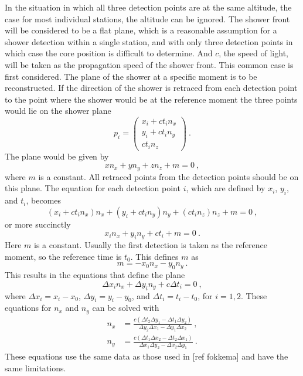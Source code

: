 In the situation in which all three detection points are at the same altitude, the case for most individual stations, the altitude can be ignored. The shower front will be considered to be a flat plane, which is a reasonable assumption for a shower detection within a single station, and with only three detection points in which case the core position is difficult to determine. And $c$, the speed of light, will be taken as the propagation speed of the shower front. This common case is first considered. The plane of the shower at a specific moment is to be reconstructed. If the direction of the shower is retraced from each detection point to the point where the shower would be at the reference moment the three points would lie on the shower plane
%
\begin{equation}
    p_i = \begin{pmatrix}
              x_i + c t_i n_x \\
              y_i + c t_i n_y \\
                    c t_i n_z
          \end{pmatrix} \ .
\end{equation}
%
The plane would be given by
%
\begin{equation}
    x n_x + y n_y + z n_z + m = 0 \ ,
\end{equation}
%
where $m$ is a constant. All retraced points from the detection points should be on this plane. The equation for each detection point $i$, which are defined by $x_i$, $y_i$, and $t_i$, becomes
%
\begin{equation}
    (x_i + c t_i n_x) n_x + (y_i + c t_i n_y) n_y + (c t_i n_z) n_z + m = 0 \ ,
\end{equation}
%
or more succinctly
%
\begin{equation}
    x_i n_x + y_i n_y + c t_i + m = 0 \ .
\end{equation}
%
Here $m$ is a constant. Usually the first detection is taken as the reference moment, so the reference time is $t_0$. This defines $m$ as
%
\begin{equation}
    m = - x_0 n_x - y_0 n_y \ .
\end{equation}
%
This results in the equations that define the plane
%
\begin{equation}
    \Delta x_i n_x + \Delta y_i n_y + c \Delta t_i = 0 \ ,
\end{equation}
%
where $\Delta x_i = x_i - x_0$, $\Delta y_i = y_i - y_0$, and $\Delta t_i = t_i - t_0$, for $i = 1,2$.
%
These equations for $n_x$ and $n_y$ can be solved with
%
\begin{equation}
    \begin{aligned}
        n_x &= \frac{c (\Delta t_2 \Delta y_1 - \Delta t_1 \Delta y_2)}
                     {\Delta y_2 \Delta x_1 - \Delta y_1 \Delta x_2} \ , \\
        n_y &= \frac{c (\Delta t_1 \Delta x_2 - \Delta t_2 \Delta x_1)}
                     {\Delta x_1 \Delta y_2 - \Delta x_2 \Delta y_1} \ .
    \end{aligned}
\end{equation}
%
These equations use the same data as those used in [ref fokkema] and have the same limitations.


